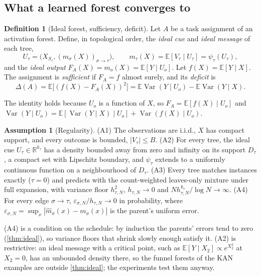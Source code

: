 \documentclass[11pt]{article}
\theoremstyle{definition}
\newtheorem{definition}[theorem]{Definition}
\newtheorem{assumption}[theorem]{Assumption}
\theoremstyle{remark}
\newcommand{\R}{\mathbb{R}}
\newcommand{\E}{\mathbb{E}}
\newcommand{\Var}{\operatorname{Var}}
\begin{document}
\subsection{What a learned forest converges to}

\begin{definition}[Ideal forest, sufficiency, deficit]\label{def:ideal}
Let $A$ be a task assignment of an activation forest.  Define, in topological order,
the \emph{ideal cue} and \emph{ideal message} of each tree,
\[
  U_\tau=\bigl(X_{S_\tau},(m_\sigma(X))_{\sigma\to\tau}\bigr),\qquad
  m_\tau(X)=\E[V_\tau\mid U_\tau]=\psi_\tau(U_\tau),
\]
and the \emph{ideal output} $F_A(X)=m_o(X)=\E[Y\mid U_o]$.  Let $f(X)=\E[Y\mid X]$.  The
assignment is \emph{sufficient} if $F_A=f$ almost surely, and its \emph{deficit} is
\[
  \Delta(A)=\E\bigl[(f(X)-F_A(X))^2\bigr]=\E\Var(Y\mid U_o)-\E\Var(Y\mid X).
\]
\end{definition}

The identity holds because $U_o$ is a function of $X$, so $F_A=\E[f(X)\mid U_o]$ and
$\Var(Y\mid U_o)=\E[\Var(Y\mid X)\mid U_o]+\Var(f(X)\mid U_o)$.

\begin{assumption}[Regularity]\label{ass:regular}
(A1) The observations are i.i.d., $X$ has compact support, and every outcome is
bounded, $|V_\tau|\le B$.  (A2) For every tree, the ideal cue
$U_\tau\in\R^{k_\tau}$ has a density bounded away from zero and infinity on its support
$D_\tau$, a compact set with Lipschitz boundary, and $\psi_\tau$ extends to a uniformly
continuous function on a neighbourhood of $D_\tau$.  (A3) Every tree matches instances exactly
($\tau=0$) and predicts with the count-weighted leaves-only mixture under full expansion,
with variance floor $h_{\tau,N}^2$, $h_{\tau,N}\to0$ and
$Nh_{\tau,N}^{k_\tau}/\log N\to\infty$.  (A4) For every edge $\sigma\to\tau$,
$\varepsilon_{\sigma,N}/h_{\tau,N}\to0$ in probability, where
$\varepsilon_{\sigma,N}=\sup_x|\hat m_\sigma(x)-m_\sigma(x)|$ is the parent's uniform
error.
\end{assumption}

(A4) is a condition on the schedule: by induction the parents' errors tend to zero
(\cref{thm:ideal}), so variance floors that shrink slowly enough satisfy it.  (A2) is
restrictive: an ideal message with a critical point, such as $\E[Y\mid X_2]\propto
e^{X_2^2}$ at $X_2=0$, has an unbounded density there, so the funnel forests of the KAN
examples are outside \cref{thm:ideal}; the experiments test them anyway.
\end{document}
